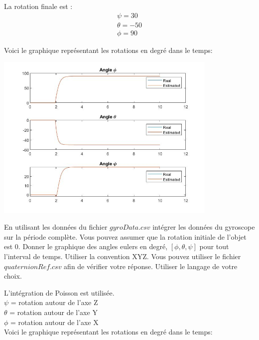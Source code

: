 \documentclass[addpoints]{exam}
\begin{document}
\begin{questions}
\begin{solution}
\begin{parts}
La rotation finale est :
\begin{align}
    \nonumber\psi = 30\\
    \nonumber\theta = -50\\
    \nonumber\phi = 90   
\end{align}

Voici le graphique représentant les rotations en degré dans le temps:

\includegraphics[width=0.8\textwidth]{image/Q1_b.JPG}

\end{parts}
\end{solution}

\question[4]
En utilisant les données du fichier $gyroData.csv$ intégrer les données du gyroscope sur la période complète. Vous pouvez assumer que la rotation initiale de l'objet est 0. Donner le graphique des angles eulers en degré, $[\phi,\theta,\psi]$ pour tout l'interval de temps. Utiliser la convention XYZ. Vous pouvez utiliser le fichier $quaternionRef.csv$ afin de vérifier votre réponse. Utiliser le langage de votre choix.

\begin{solution}
    L'intégration de Poisson est utilisée.\\
    $\psi$ = rotation autour de l'axe Z\\
    $\theta$ = rotation autour de l'axe Y\\
    $\phi$ = rotation autour de l'axe X\\
     Voici le graphique représentant les rotations en degré dans le temps:
    

\end{solution}
\end{questions}
\end{document}
